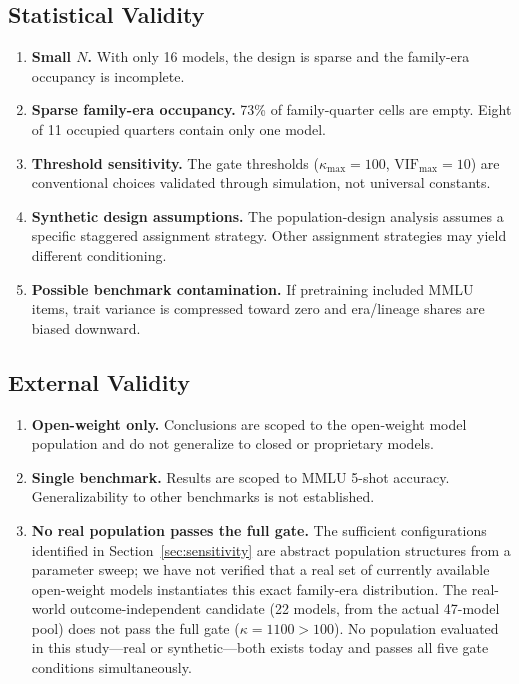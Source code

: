 \documentclass{ieeeaccess}
\theoremstyle{definition}
\theoremstyle{plain}
\begin{document}
\subsection{Statistical Validity}
\begin{enumerate}
\item \textbf{Small $N$.} With only 16 models, the design is sparse and the family-era occupancy is incomplete.
\item \textbf{Sparse family-era occupancy.} 73\% of family-quarter cells are empty. Eight of 11 occupied quarters contain only one model.
\item \textbf{Threshold sensitivity.} The gate thresholds ($\kappa_{\max} = 100$, $\text{VIF}_{\max} = 10$) are conventional choices validated through simulation, not universal constants.
\item \textbf{Synthetic design assumptions.} The population-design analysis assumes a specific staggered assignment strategy. Other assignment strategies may yield different conditioning.
\item \textbf{Possible benchmark contamination.} If pretraining included MMLU items, trait variance is compressed toward zero and era/lineage shares are biased downward.
\end{enumerate}

\subsection{External Validity}
\begin{enumerate}
\item \textbf{Open-weight only.} Conclusions are scoped to the open-weight model population and do not generalize to closed or proprietary models.
\item \textbf{Single benchmark.} Results are scoped to MMLU 5-shot accuracy. Generalizability to other benchmarks is not established.
\item \textbf{No real population passes the full gate.} The sufficient configurations identified in Section~\ref{sec:sensitivity} are abstract population structures from a parameter sweep; we have not verified that a real set of currently available open-weight models instantiates this exact family-era distribution. The real-world outcome-independent candidate (22 models, from the actual 47-model pool) does not pass the full gate ($\kappa = 1100 > 100$). No population evaluated in this study---real or synthetic---both exists today and passes all five gate conditions simultaneously.
\end{enumerate}
\end{document}
